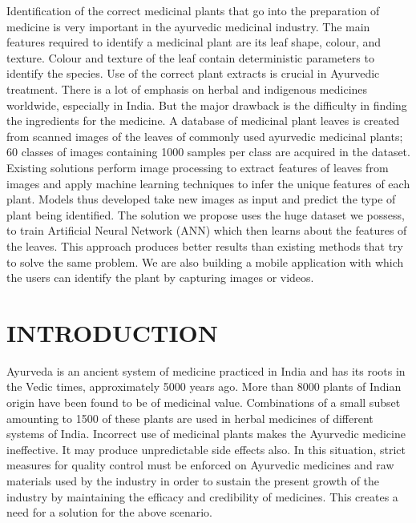 Identification of the correct medicinal plants that go into the preparation of
medicine is very important in the ayurvedic medicinal industry.
The main features required to identify a medicinal plant are its leaf shape,
colour, and texture. Colour and texture of the leaf contain deterministic
parameters to identify the species. Use of the correct plant extracts is crucial
in Ayurvedic treatment. There is a lot of emphasis on herbal and indigenous
medicines worldwide, especially in India. But the major drawback is the
difficulty in finding the ingredients for the medicine.
A database of medicinal plant leaves is created from scanned images of the
leaves of commonly used ayurvedic medicinal plants; 60 classes of images
containing 1000 samples per class are acquired in the dataset.
Existing solutions perform image processing to extract features of leaves
from images and apply machine learning techniques to infer the unique
features of each plant. Models thus developed take new images as input and
predict the type of plant being identified.
The solution we propose uses the huge dataset we possess, to train Artificial
Neural Network (ANN) which then learns about the features of the leaves. This
approach produces better results than existing methods that try to solve the same problem.
We are also building a mobile
application with which the users can identify the plant by capturing images or videos.

%       
%
\tableofcontents
{}
\listoffigures
{}
\listoftables

\mainmatter



\chapter {INTRODUCTION}
Ayurveda is an ancient system of medicine practiced in India and has its roots in the Vedic times, approximately 5000 years ago. More than 8000 plants of Indian origin have been found to be of medicinal value. Combinations of a small subset amounting to 1500 of these plants are used in herbal medicines of different systems of India. Incorrect use of medicinal plants makes the Ayurvedic medicine ineffective. It may produce unpredictable side effects also. In this situation, strict measures for quality control must
be enforced on Ayurvedic medicines and raw materials used by the industry in order to sustain the present growth of the industry by maintaining the efficacy and credibility of medicines. This creates a need for a solution for the above scenario.

